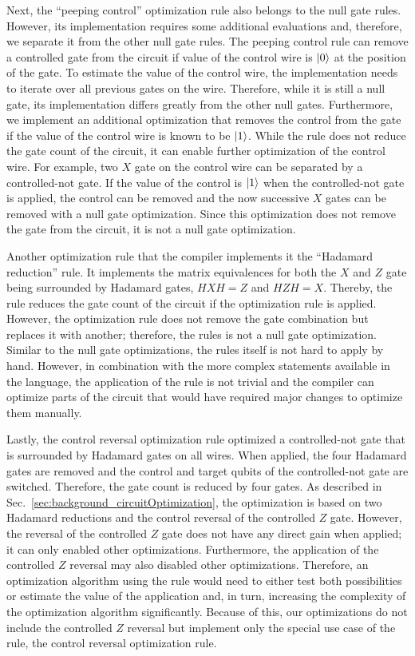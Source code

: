 Next, the ``peeping control'' optimization rule also belongs to the null gate rules. However, its implementation requires some additional evaluations and, therefore, we separate it from the other null gate rules. The peeping control rule can remove a controlled gate from the circuit if value of the control wire is $\ket{0}$ at the position of the gate. To estimate the value of the control wire, the implementation needs to iterate over all previous gates on the wire. Therefore, while it is still a null gate, its implementation differs greatly from the other null gates. Furthermore, we implement an additional optimization that removes the control from the gate if the value of the control wire is known to be $\ket{1}$. While the rule does not reduce the gate count of the circuit, it can enable further optimization of the control wire. For example, two $X$ gate on the control wire can be separated by a controlled-not gate. If the value of the control is $\ket{1}$ when the controlled-not gate is applied, the control can be removed and the now successive $X$ gates can be removed with a null gate optimization. Since this optimization does not remove the gate from the circuit, it is not a null gate optimization.

Another optimization rule that the compiler implements it the ``Hadamard reduction'' rule. It implements the matrix equivalences for both the $X$ and $Z$ gate being surrounded by Hadamard gates, $HXH = Z$ and $HZH = X$. Thereby, the rule reduces the gate count of the circuit if the optimization rule is applied. However, the optimization rule does not remove the gate combination but replaces it with another; therefore, the rules is not a null gate optimization. 
Similar to the null gate optimizations, the rules itself is not hard to apply by hand. However, in combination with the more complex statements available in the language, the application of the rule is not trivial and the compiler can optimize parts of the circuit that would have required major changes to optimize them manually.

Lastly, the control reversal optimization rule optimized a controlled-not gate that is surrounded by Hadamard gates on all wires. When applied, the four Hadamard gates are removed and the control and target qubits of the controlled-not gate are switched. Therefore, the gate count is reduced by four gates. As described in Sec.~\ref{sec:background_circuitOptimization}, the optimization is based on two Hadamard reductions and the control reversal of the controlled $Z$ gate. However, the reversal of the controlled $Z$ gate does not have any direct gain when applied; it can only enabled other optimizations. Furthermore, the application of the controlled $Z$ reversal may also disabled other optimizations. Therefore, an optimization algorithm using the rule would need to either test both possibilities or estimate the value of the application and, in turn, increasing the complexity of the optimization algorithm significantly. Because of this, our optimizations do not include the controlled $Z$ reversal but implement only the special use case of the rule, the control reversal optimization rule.

